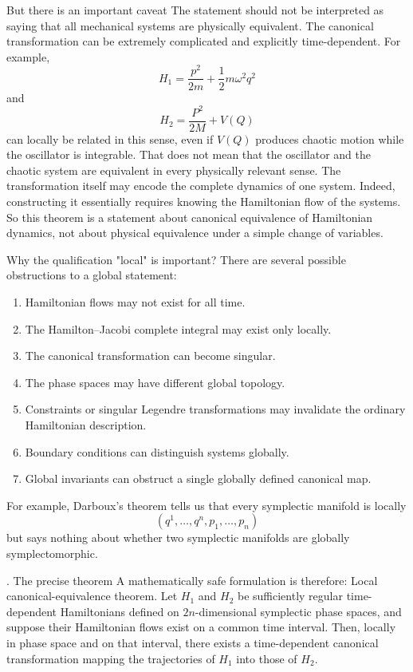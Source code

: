 But there is an important caveat The statement should not be interpreted as
 saying that all mechanical systems are physically equivalent. The canonical
 transformation can be extremely complicated and explicitly time-dependent. For
 example, 
 \[ H_1=\frac{p^2}{2m}+\frac12m\omega^2q^2 \]
 and \[     H_2=\frac{P^2}{2M}+V(Q) \] 
 can locally be related in this sense, even if
 \(V(Q)\) produces chaotic motion while the oscillator is integrable. That does
 not mean that the oscillator and the chaotic system are equivalent in every
 physically relevant sense. The transformation itself may encode the complete
 dynamics of one system. Indeed, constructing it essentially requires knowing
 the Hamiltonian flow of the systems. So this theorem is a statement about
 canonical equivalence of Hamiltonian dynamics, not about physical equivalence
 under a simple change of variables.

Why the qualification "local" is important?
There are several possible obstructions to a global statement:
\begin{enumerate}
   \item Hamiltonian flows may not exist for all time.
   \item The Hamilton–Jacobi complete integral may exist only locally.
   \item The canonical transformation can become singular.
   \item The phase spaces may have different global topology.
   \item Constraints or singular Legendre transformations may invalidate the
       ordinary Hamiltonian description.
   \item Boundary conditions can distinguish systems globally.
   \item Global invariants can obstruct a single globally defined canonical map.
\end{enumerate}
For example, Darboux's theorem tells us that every symplectic manifold is locally
\[
(q^1,\ldots,q^n,p_1,\ldots,p_n)
\]
but says nothing about whether two symplectic manifolds are globally symplectomorphic.

. The precise theorem
A mathematically safe formulation is therefore:
Local canonical-equivalence theorem.
Let \(H_1\) and \(H_2\) be sufficiently regular time-dependent Hamiltonians
defined on \(2n\)-dimensional symplectic phase spaces, and suppose their
Hamiltonian flows exist on a common time interval. Then, locally in phase space
and on that interval, there exists a time-dependent canonical transformation
mapping the trajectories of \(H_1\) into those of \(H_2\).

